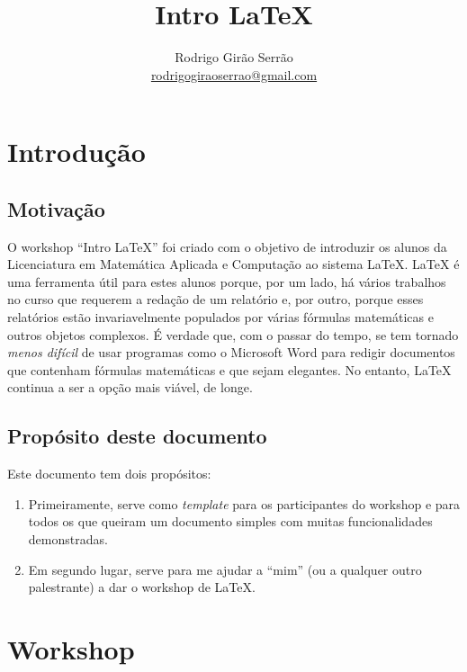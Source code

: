 \documentclass[11pt]{article}
\title{Intro LaTeX}
\author{Rodrigo Girão Serrão \\
        \href{mailto:rodrigogiraoserrao@gmail.com}{rodrigogiraoserrao@gmail.com}
}
\begin{document}
\maketitle

\tableofcontents

\clearpage

\section{Introdução}

\subsection{Motivação}

O workshop ``Intro LaTeX'' foi criado com o objetivo de introduzir os alunos
da Licenciatura em Matemática Aplicada e Computação ao sistema LaTeX.
LaTeX é uma ferramenta útil para estes alunos porque, por um lado, há vários
trabalhos no curso que requerem a redação de um relatório e, por outro, porque
esses relatórios estão invariavelmente populados por várias fórmulas matemáticas
e outros objetos complexos.
É verdade que, com o passar do tempo, se tem tornado \textit{menos difícil} de
usar programas como o Microsoft Word para redigir documentos que contenham
fórmulas matemáticas e que sejam elegantes.
No entanto, LaTeX continua a ser a opção mais viável, de longe.

\subsection{Propósito deste documento}

Este documento tem dois propósitos:

\begin{enumerate}
    \item Primeiramente, serve como \textit{template} para os participantes do
    workshop e para todos os que queiram um documento simples com muitas
    funcionalidades demonstradas.

    \item Em segundo lugar, serve para me ajudar a ``mim'' (ou a qualquer outro
    palestrante) a dar o workshop de LaTeX.
\end{enumerate}

\clearpage
\section{Workshop}
\end{document}
